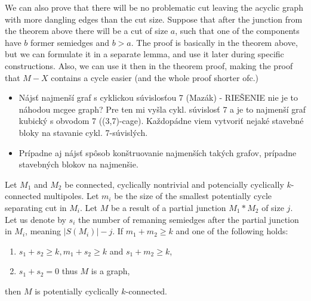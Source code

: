 \documentclass[12pt, twoside]{book}
\begin{document}
\todo{}We can also prove that there will be no problematic cut leaving the acyclic graph with more dangling edges than the cut size. Suppose that after the junction from the theorem above there will be a cut of size $a$, such that one of the components have $b$ former semiedges and $b>a$. The proof is basically in the theorem above, but we can formulate it in a separate lemma, and use it later during specific constructions. Also, we can use it then in the theorem proof, making the proof that $M-X$ contains a cycle easier (and the whole proof shorter ofc.)

\begin{itemize}
	\item Nájsť najmenší graf s cyklickou súvislosťou 7 (Mazák) - RIEŠENIE nie je to náhodou mcgee graph? Pre ten mi vyšla cykl. súvislosť 7 a je to najmenší graf kubický s obvodom 7 ((3,7)-cage). Každopádne viem vytvoriť nejaké stavebné bloky na stavanie cykl. 7-súvislých.
	\item Prípadne aj nájsť spôsob konštruovanie najmenších takých grafov, prípadne stavebných blokov na najmenšie.
\end{itemize}

\begin{theorem}\label{th:connecting-potencially-cyclically-connected-with-number-of-resulting-semiedges}
	Let $M_1$ and $M_2$ be connected, cyclically nontrivial and potencially cyclically $k$-connected multipoles. Let $m_i$ be the size of the smallest potentially cycle separating cut in $M_i$. Let $M$ be a result of a partial junction $M_1*M_2$ of size $j$. Let us denote by $s_i$ the number of remaning semiedges after the partial junction in $M_i$, meaning $|S(M_i)|-j$. If $m_1+m_2\geq k$ and one of the following holds:
	
	\begin{enumerate}
		\item $s_1+s_2\geq k, m_1+s_2\geq k$ and $s_1+m_2\geq k$,
		\item $s_1+s_2=0$ thus $M$ is a graph,
	\end{enumerate}

	then $M$ is potentially cyclically $k$-connected.
\end{theorem}
\end{document}
